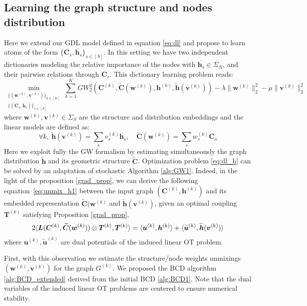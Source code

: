 \documentclass{article}
\newcommand{\scalar}[2]{\langle #1 , #2 \rangle}
\def\eqref#1{equation~\ref{#1}}
\def\vh{{\bm{h}}}
\def\vu{{\bm{u}}}
\def\vv{{\bm{v}}}
\def\vw{{\bm{w}}}
\def\mC{{\bm{C}}}
\def\mL{{\bm{L}}}
\def\mT{{\bm{T}}}
\begin{document}
	\subsection{Learning the graph structure and nodes distribution}
	Here we extend our GDL model defined in
	equation \ref{eq:dl} and propose to learn atoms of the form $\{\overline{\mC_s},\overline{\vh_s}\}_{s\in [S]}$. In this setting we have
	two independent dictionaries modeling the relative importance of the nodes with
	$\overline{\vh_s} \in \Sigma_N$, and their pairwise relations through $\overline{\mC_s}$. This
	dictionary learning problem reads:
	\begin{equation}
	\min_{\substack{\{(\vw^{(k)},\vv^{(k)})\}_{k \in [K]}\\
			\{(\overline{\mC}_s,\overline{\vh}_s)\}_{s\in [S]}}} \sum_{k=1}^K  GW^2_2\left(\mC^{(k)},\widetilde{\mC}(\vw^{(k)}), \vh^{(k)}, \widetilde{\vh}(\vv^{(k)})\right) - \lambda \|\vw^{(k)}\|^2_2 - \mu \|\vv^{(k)}\|^2_2\label{eq:dl_h}
	\end{equation}
	where $\vw^{(k)},\vv^{(k)} \in \Sigma_S$ are the structure and distribution embeddings and the linear models are defined as:
	\begin{equation}\label{eq:GDLextended_rpz}
	\forall k,\
	\widetilde{\vh}(\vv^{(k)}) = \sum_s v^{(k)}_s\overline{\vh_s},\quad  
	\widetilde{\mC}(\vw^{(k)}) = \sum_s w^{(k)}_s \overline{\mC_s} 
	\end{equation}
	Here we exploit fully the GW
	formalism by estimating simultaneously the graph distribution $\widetilde{\vh}$
	and its geometric structure $\widetilde{\mC}$. Optimization problem \ref{eq:dl_h} can
	be solved by an adaptation of stochastic Algorithm \ref{alg:GW1}. Indeed, in the light of the proposition \ref{grad_prop}, we can derive the following \eqref{eq:unmix_h1} between the input graph $(\mC^{(k)}, \vh^{(k)})$ and its embedded representation $\widetilde{\mC}(\vw^{(k)}$ and $\widetilde{\vh} (\vv^{(k)})$, given an optimal coupling $\mT^{(k)}$ satisfying Proposition \ref{grad_prop}, 
	\begin{equation}\label{eq:unmix_h1}
	2\scalar{\mL(\mC^{(k)},\widetilde{\mC}(\vw^{(k)})) \otimes \mT^{(k)}}{\mT^{(k)}}\\ 
	= \scalar{\vu^{(k)}}{\vh^{(k)}} +  \scalar{\widetilde{\vu}^{(k)}}{\widetilde{\vh}(\vv^{(k)})}
	\end{equation}
	where $\vu^{(k)}, \widetilde{\vu}^{(k)}$ are dual potentials of the induced linear OT problem.
	
	First, with this observation we estimate
	the structure/node weights unmixings
	$(\vw^{(k)},\vv^{(k)})$ for the graph $G^{(k)}$. We proposed the BCD algorithm \ref{alg:BCD_extended} derived from the initial BCD \ref{alg:BCD1}. Note that the dual variables of the induced linear OT problems are centered to ensure numerical stability. 
	
\end{document}
